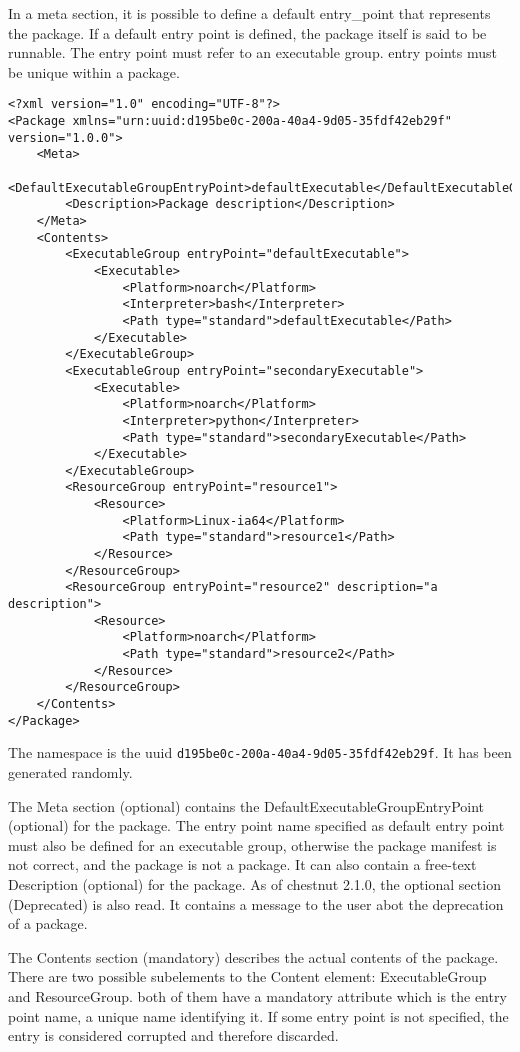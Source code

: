 In a meta section, it is possible to define a default entry\_point that
represents the package. If a default entry point is defined, the package itself
is said to be runnable. The entry point must refer to an executable group.
entry points must be unique within a package.

\begin{verbatim}
<?xml version="1.0" encoding="UTF-8"?>
<Package xmlns="urn:uuid:d195be0c-200a-40a4-9d05-35fdf42eb29f" version="1.0.0">
    <Meta>
        <DefaultExecutableGroupEntryPoint>defaultExecutable</DefaultExecutableGroupEntryPoint>
        <Description>Package description</Description>
    </Meta>
    <Contents>
        <ExecutableGroup entryPoint="defaultExecutable">
            <Executable>
                <Platform>noarch</Platform>
                <Interpreter>bash</Interpreter>
                <Path type="standard">defaultExecutable</Path>
            </Executable>
        </ExecutableGroup>
        <ExecutableGroup entryPoint="secondaryExecutable">
            <Executable>
                <Platform>noarch</Platform>
                <Interpreter>python</Interpreter>
                <Path type="standard">secondaryExecutable</Path>
            </Executable>
        </ExecutableGroup>
        <ResourceGroup entryPoint="resource1">
            <Resource>
                <Platform>Linux-ia64</Platform>
                <Path type="standard">resource1</Path>
            </Resource>
        </ResourceGroup>
        <ResourceGroup entryPoint="resource2" description="a description">
            <Resource>
                <Platform>noarch</Platform>
                <Path type="standard">resource2</Path>
            </Resource>
        </ResourceGroup>
    </Contents>
</Package>
\end{verbatim}

The namespace is the uuid \verb+d195be0c-200a-40a4-9d05-35fdf42eb29f+. It has
been generated randomly.  

The Meta section (optional) contains the
DefaultExecutableGroupEntryPoint (optional) for the package. The entry point name
specified as default entry point must also be defined for an executable group,
otherwise the package manifest is not correct, and the package is not a
package. It can also contain a free-text Description (optional) for the package.
As of chestnut 2.1.0, the optional section (Deprecated) is also read.
It contains a message to the user abot the deprecation of a package.

The Contents section (mandatory) describes the actual contents of the package. There are two
possible subelements to the Content element: ExecutableGroup and ResourceGroup.
both of them have a mandatory attribute which is the entry point name, a
unique name identifying it. If some entry point is not specified, the entry is
considered corrupted and therefore discarded.


